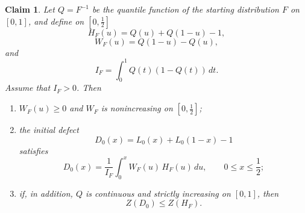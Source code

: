 \documentclass[onecolumn]{article}
\newtheorem{claim}[theorem]{Claim}
\begin{document}
\begin{claim}
\label{start-law-HF} Let $Q=F^{-1}$ be the quantile function of the starting
distribution $F$ on $[0,1]$, and define on $[0,\tfrac{1}{2}]$ 
\begin{equation}
H_{F}(u)=Q(u)+Q(1-u)-1,  \label{1362}
\end{equation}%
\begin{equation}
W_{F}(u)=Q(1-u)-Q(u),  \label{1363}
\end{equation}%
and 
\begin{equation}
I_{F}=\int_{0}^{1}Q(t)(1-Q(t))\,dt.  \label{1364}
\end{equation}%
Assume that $I_{F}>0$. Then

\begin{enumerate}
\item $W_{F}(u)\geq 0$ and $W_{F}$ is nonincreasing on $[0,\tfrac{1}{2}]$;

\item the initial defect 
\begin{equation}
D_{0}(x)=L_{0}(x)+L_{0}(1-x)-1  \label{1365}
\end{equation}%
satisfies 
\begin{equation}
D_{0}(x)=\frac{1}{I_{F}}\int_{0}^{x}W_{F}(u)\,H_{F}(u)\,du,\qquad 0\leq
x\leq \frac{1}{2};  \label{1366}
\end{equation}

\item if, in addition, $Q$ is continuous and strictly increasing on $[0,1]$,
then 
\begin{equation}
Z(D_{0})\leq Z(H_{F}).  \label{1367}
\end{equation}
\end{enumerate}
\end{claim}
\end{document}
